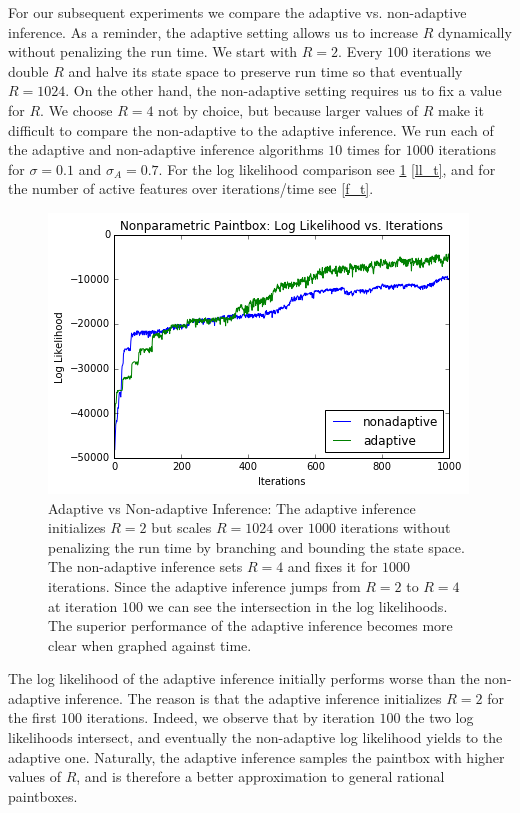 \documentclass{article}
\begin{document}
For our subsequent experiments we compare the adaptive vs. non-adaptive inference.  As a reminder, the adaptive setting allows us to increase $R$ dynamically without penalizing the run time.  We start with $R = 2$.  Every $100$ iterations we double $R$ and halve its state space to preserve run time so that eventually $R = 1024$.  On the other hand, the non-adaptive setting requires us to fix a value for $R$.  We choose $R = 4$ not by choice, but because larger values of $R$ make it difficult to compare the non-adaptive to the adaptive inference.  We run each of the adaptive and non-adaptive inference algorithms $10$ times for $1000$ iterations for $\sigma = 0.1$ and $\sigma_A = 0.7$.  For the log likelihood comparison see \ref{ll_it} \ref{ll_t}, and for the number of active features over iterations/time see \ref{f_t}.         
\begin{figure}[ht]
\vskip 0.2in
\begin{center}
\centerline{\includegraphics[width=\columnwidth]{ll_it}}
\caption{Adaptive vs Non-adaptive Inference:  The adaptive inference initializes $R = 2$ but scales $R = 1024$ over $1000$ iterations without penalizing the run time by branching and bounding the state space.  The non-adaptive inference sets $R = 4$ and fixes it for $1000$ iterations.  Since the adaptive inference jumps from $R = 2$ to $R = 4$ at iteration $100$ we can see the intersection in the log likelihoods.  The superior performance of the adaptive inference becomes more clear when graphed against time.}
\label{ll_it}
\end{center}
\vskip -0.2in
\end{figure} 
The log likelihood of the adaptive inference initially performs worse than the non-adaptive inference.  The reason is that the adaptive inference initializes $R = 2$ for the first $100$ iterations.  Indeed, we observe that by iteration $100$ the two log likelihoods intersect, and eventually the non-adaptive log likelihood yields to the adaptive one.  Naturally, the adaptive inference samples the paintbox with higher values of $R$, and is therefore a better approximation to general rational paintboxes.            
\end{document}
